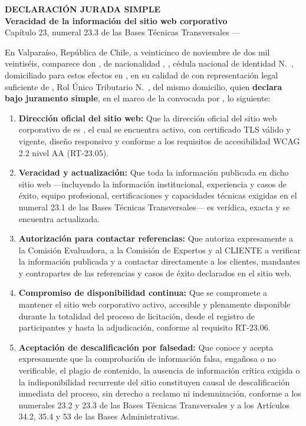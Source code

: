 \documentclass[11pt]{article}
\begin{document}
\begin{center}
  {\Large\bfseries DECLARACIÓN JURADA SIMPLE}\\[5pt]
  {\bfseries Veracidad de la información del sitio web corporativo}\\[3pt]
  {\small Capítulo 23, numeral 23.3 de las Bases Técnicas Transversales --- \LFXlicitacion}
\end{center}

\noindent En Valparaíso, República de Chile, a veinticinco de noviembre de dos mil veintiséis, comparece don \textbf{\LFXrepresentante}, de nacionalidad \SIMnacionalidad, \SIMprofesion, cédula nacional de identidad N.\textdegree~\SIMrunrepresentante, domiciliado para estos efectos en \LFXdomicilio, en su calidad de \LFXcargo{} con representación legal suficiente de \textbf{\LFXempresa}, Rol Único Tributario N.\textdegree~\LFXrut, del mismo domicilio, quien \textbf{declara bajo juramento simple}, en el marco de la \LFXlicitacion{} convocada por \textbf{\LFXcliente}, lo siguiente:

\begin{enumerate}[label=\arabic*.,leftmargin=2em,itemsep=3pt,topsep=4pt]
  \item \textbf{Dirección oficial del sitio web:} Que la dirección oficial del sitio web corporativo de \LFXempresa{} es \textbf{\texttt{\SIMweb}}, el cual se encuentra activo, con certificado TLS válido y vigente, diseño responsivo y conforme a los requisitos de accesibilidad WCAG 2.2 nivel AA (RT-23.05).
  \item \textbf{Veracidad y actualización:} Que toda la información publicada en dicho sitio web ---incluyendo la información institucional, experiencia y casos de éxito, equipo profesional, certificaciones y capacidades técnicas exigidas en el numeral 23.1 de las Bases Técnicas Transversales--- es verídica, exacta y se encuentra actualizada.
  \item \textbf{Autorización para contactar referencias:} Que autoriza expresamente a la Comisión Evaluadora, a la Comisión de Expertos y al CLIENTE a verificar la información publicada y a contactar directamente a los clientes, mandantes y contrapartes de las referencias y casos de éxito declarados en el sitio web.
  \item \textbf{Compromiso de disponibilidad continua:} Que \LFXempresa{} se compromete a mantener el sitio web corporativo activo, accesible y plenamente disponible durante la totalidad del proceso de licitación, desde el registro de participantes y hasta la adjudicación, conforme al requisito RT-23.06.
  \item \textbf{Aceptación de descalificación por falsedad:} Que conoce y acepta expresamente que la comprobación de información falsa, engañosa o no verificable, el plagio de contenido, la ausencia de información crítica exigida o la indisponibilidad recurrente del sitio constituyen causal de descalificación inmediata del proceso, sin derecho a reclamo ni indemnización, conforme a los numerales 23.2 y 23.3 de las Bases Técnicas Transversales y a los Artículos 34.2, 35.4 y 53\textdegree{} de las Bases Administrativas.
\end{enumerate}
\end{document}
